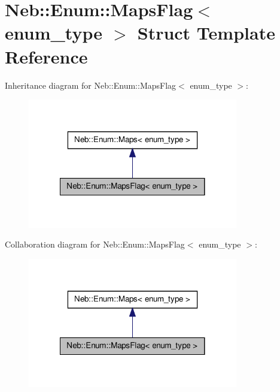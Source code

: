 \hypertarget{structNeb_1_1Enum_1_1MapsFlag}{\section{\-Neb\-:\-:\-Enum\-:\-:\-Maps\-Flag$<$ enum\-\_\-type $>$ \-Struct \-Template \-Reference}
\label{structNeb_1_1Enum_1_1MapsFlag}
}


\-Inheritance diagram for \-Neb\-:\-:\-Enum\-:\-:\-Maps\-Flag$<$ enum\-\_\-type $>$\-:
\nopagebreak
\begin{figure}[H]
\begin{center}
\leavevmode
\includegraphics[width=260pt]{structNeb_1_1Enum_1_1MapsFlag__inherit__graph}
\end{center}
\end{figure}


\-Collaboration diagram for \-Neb\-:\-:\-Enum\-:\-:\-Maps\-Flag$<$ enum\-\_\-type $>$\-:
\nopagebreak
\begin{figure}[H]
\begin{center}
\leavevmode
\includegraphics[width=260pt]{structNeb_1_1Enum_1_1MapsFlag__coll__graph}
\end{center}
\end{figure}

